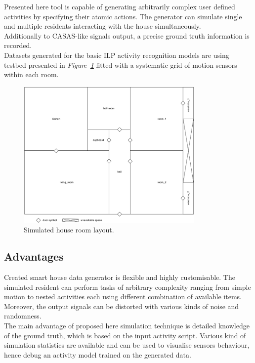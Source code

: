 \documentclass[10pt, a4paper, pdflatex, leqno, twoside, openright]{report}
\begin{document}
Presented here tool is capable of generating arbitrarily complex user defined activities by specifying their atomic actions. The generator can simulate single and multiple residents interacting with the house simultaneously.\\
Additionally to CASAS-like signals output, a precise ground truth information is recorded.\\

Datasets generated for the basic ILP activity recognition models are using testbed presented in \emph{Figure~\ref{fig:simHouse}} fitted with a systematic grid of motion sensors within each room.

\begin{figure}[htb]
  \centering%
  \includegraphics[height=7.3cm]{./gfx/room_layout}
  \caption{Simulated house room layout.\label{fig:simHouse}}
\end{figure}

    \subsection{Advantages}
Created smart house data generator is flexible and highly customisable. The simulated resident can perform tasks of arbitrary complexity ranging from simple motion to nested activities each using different combination of available items. Moreover, the output signals can be distorted with various kinds of noise and randomness.\\

The main advantage of proposed here simulation technique is detailed knowledge of the ground truth, which is based on the input activity script. Various kind of simulation statistics are available and can be used to visualise sensors behaviour, hence debug an activity model trained on the generated data.\\
\end{document}
